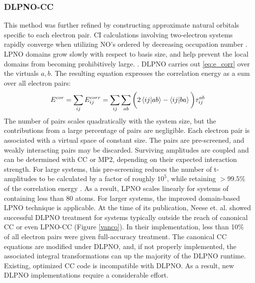 \subsubsection{DLPNO-CC}
  This method was further refined by constructing approximate natural orbitals specific to each electron pair. CI calculations involving two-electron systems rapidly converge when utilizing NO's ordered by decreasing occupation number \cite{PhysRev.97.1474}. LPNO domains grow slowly with respect to basis size, and help prevent the local domains from becoming prohibitively large. \cite{MEYER, LPNOCC}.  DLPNO carries out \cref{eq:e_corr} over the virtuals $a,b$. The resulting equation expresses the correlation energy as a sum over all electron pairs: 
\begin{equation}
E^{cor} = \sum_{ij}E^{corr}_{ij} = \sum_{ij} \sum_{ab}  \bigg( 2 \braket{ij|ab} - \braket{ij|ba}\bigg) \tau^{ab}_{ij}
\end{equation}
The number of pairs scales quadratically with the system size, but the contributions from a large percentage of pairs are negligible. Each electron pair is associated with a virtual space of constant size. The pairs are pre-screened, and weakly interacting pairs may be discarded. Surviving amplitudes are coupled and can be determined with CC or MP2, depending on their expected interaction strength. For large systems, this pre-screening reduces the number of t-amplitudes to be calculated by a factor of roughly $10^5$, while retaining $> 99.5\%$ of the correlation energy \cite{DLPNOCC}. As a result, LPNO scales linearly for systems of containing less than 80 atoms. For larger systems, the improved domain-based LPNO  technique is applicable.  At the time of its publication, Neese et. al. showed successful DLPNO treatment for systems typically outside the reach of canonical CC or even LPNO-CC (Figure \ref{vanco}). In their implementation, less than 10\% of all electron pairs were given full-accuracy treatment. The canonical CC equations are modified under DLPNO, and, if not properly implemented, the associated integral transformations can up the majority of the DLPNO runtime. Existing, optimized CC code is incompatible with DLPNO. As a result, new DLPNO implementations require a considerable effort.
